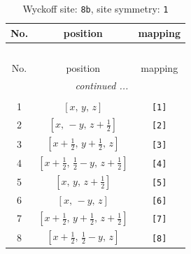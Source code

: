 \documentclass[fleqn,8pt]{jsarticle}
\begin{document}
\begin{longtable}{ccc}
\caption{Wyckoff site: {\tt 8b}, site symmetry: {\tt 1}}
 \\
 \hline \hline
No. & position & mapping \\ \hline \endfirsthead

\multicolumn{2}{l}{\tablename\ \thetable{}} \\
 \hline \hline
No. & position & mapping \\ \hline \endhead

 \hline \hline
\multicolumn{2}{r}{\footnotesize\it continued ...} \\ \endfoot

 \hline \hline
\multicolumn{2}{r}{} \\ \endlastfoot

1 & $\left[ x,\, y,\, z \right]$ & {\tt [1]} \\ \hline
2 & $\left[ x,\, - y,\, z + \frac{1}{2} \right]$ & {\tt [2]} \\ \hline
3 & $\left[ x + \frac{1}{2},\, y + \frac{1}{2},\, z \right]$ & {\tt [3]} \\ \hline
4 & $\left[ x + \frac{1}{2},\, \frac{1}{2} - y,\, z + \frac{1}{2} \right]$ & {\tt [4]} \\ \hline
5 & $\left[ x,\, y,\, z + \frac{1}{2} \right]$ & {\tt [5]} \\ \hline
6 & $\left[ x,\, - y,\, z \right]$ & {\tt [6]} \\ \hline
7 & $\left[ x + \frac{1}{2},\, y + \frac{1}{2},\, z + \frac{1}{2} \right]$ & {\tt [7]} \\ \hline
8 & $\left[ x + \frac{1}{2},\, \frac{1}{2} - y,\, z \right]$ & {\tt [8]} \\
\end{longtable}
\end{document}
